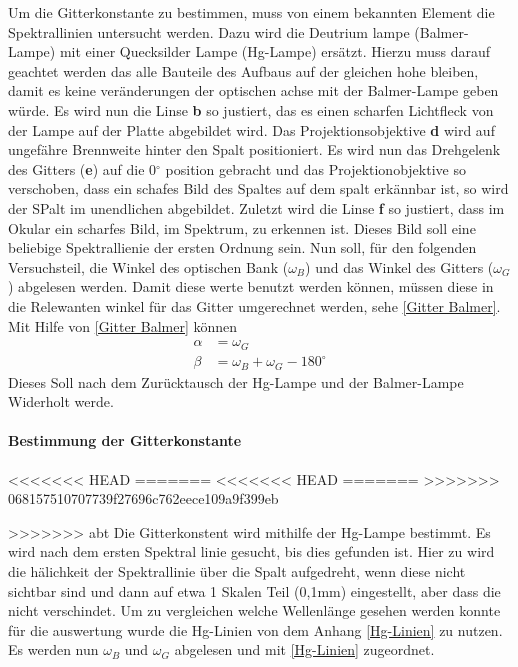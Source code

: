 Um die Gitterkonstante zu bestimmen, muss von einem bekannten Element die Spektrallinien untersucht werden. 
Dazu wird die Deutrium lampe (Balmer-Lampe) mit einer Quecksilder Lampe (Hg-Lampe) ersätzt. 
Hierzu muss darauf geachtet werden das alle Bauteile des Aufbaus auf der gleichen hohe bleiben, damit es keine veränderungen der optischen achse mit der Balmer-Lampe geben würde.
Es wird nun die Linse \textbf{b} so justiert, das es einen scharfen Lichtfleck von der Lampe auf der Platte abgebildet wird.
Das Projektionsobjektive \textbf{d} wird auf ungefähre Brennweite hinter den Spalt positioniert. 
Es wird nun das Drehgelenk des Gitters (\textbf{e}) auf die 0$^\circ$ position gebracht und das Projektionobjektive so verschoben, dass ein schafes Bild des Spaltes auf dem spalt erkännbar ist, so wird der SPalt im unendlichen abgebildet.
Zuletzt wird die Linse \textbf{f} so justiert, dass im Okular ein scharfes Bild, im Spektrum, zu erkennen ist. Dieses Bild soll eine beliebige Spektrallienie der ersten Ordnung sein.
Nun soll, für den folgenden Versuchsteil, die Winkel des optischen Bank ($\omega_B$) und das Winkel des Gitters ($\omega_G$) abgelesen werden.  
Damit diese werte benutzt werden können, müssen diese in die Relewanten winkel für das Gitter umgerechnet werden, sehe \cref{Gitter Balmer}. 
Mit Hilfe von \cref{Gitter Balmer} können 
\begin{align}
    \alpha &= \omega_G \\  \beta &= \omega_B + \omega_G - 180^\circ 
\end{align}
Dieses Soll nach dem Zurücktausch der Hg-Lampe und der Balmer-Lampe Widerholt werde. 


\paragraph{Bestimmung der Gitterkonstante}
<<<<<<< HEAD
=======
<<<<<<< HEAD
=======
>>>>>>> 068157510707739f27696c762eece109a9f399eb

>>>>>>> abt
Die Gitterkonstent wird mithilfe der Hg-Lampe bestimmt.
Es wird nach dem ersten Spektral linie gesucht, bis dies gefunden ist. 
Hier zu wird die hälichkeit der Spektrallinie über die Spalt aufgedreht, wenn diese nicht sichtbar sind und dann auf etwa 1 Skalen Teil (0,1mm) eingestellt, aber dass die nicht verschindet.
Um zu vergleichen welche Wellenlänge gesehen werden konnte für die auswertung wurde die Hg-Linien von dem Anhang \cref{Hg-Linien} zu nutzen.
Es werden nun $\omega_B$ und $\omega_G$ abgelesen und mit \cref{Hg-Linien} zugeordnet.

